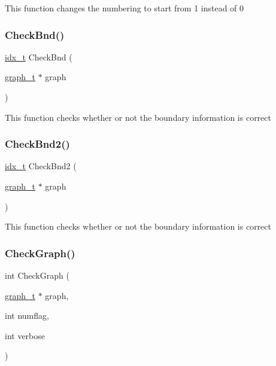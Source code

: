 This function changes the numbering to start from 1 instead of 0 \mbox{\label{a00945_a441777159a737edb038e14d7f6757382}} 
\subsubsection{\texorpdfstring{Check\+Bnd()}{CheckBnd()}}
{\footnotesize\ttfamily \hyperlink{a00876_aaa5262be3e700770163401acb0150f52}{idx\+\_\+t} Check\+Bnd (\begin{DoxyParamCaption}\item[{\hyperlink{a00734}{graph\+\_\+t} $\ast$}]{graph }\end{DoxyParamCaption})}

This function checks whether or not the boundary information is correct \mbox{\label{a00945_aee6f89ea1f2d4ee14be5a298539121ca}} 
\subsubsection{\texorpdfstring{Check\+Bnd2()}{CheckBnd2()}}
{\footnotesize\ttfamily \hyperlink{a00876_aaa5262be3e700770163401acb0150f52}{idx\+\_\+t} Check\+Bnd2 (\begin{DoxyParamCaption}\item[{\hyperlink{a00734}{graph\+\_\+t} $\ast$}]{graph }\end{DoxyParamCaption})}

This function checks whether or not the boundary information is correct \mbox{\label{a00945_a3fb602d633b7a36fa4027c192ed7eb45}} 
\subsubsection{\texorpdfstring{Check\+Graph()}{CheckGraph()}}
{\footnotesize\ttfamily int Check\+Graph (\begin{DoxyParamCaption}\item[{\hyperlink{a00734}{graph\+\_\+t} $\ast$}]{graph,  }\item[{int}]{numflag,  }\item[{int}]{verbose }\end{DoxyParamCaption})}

